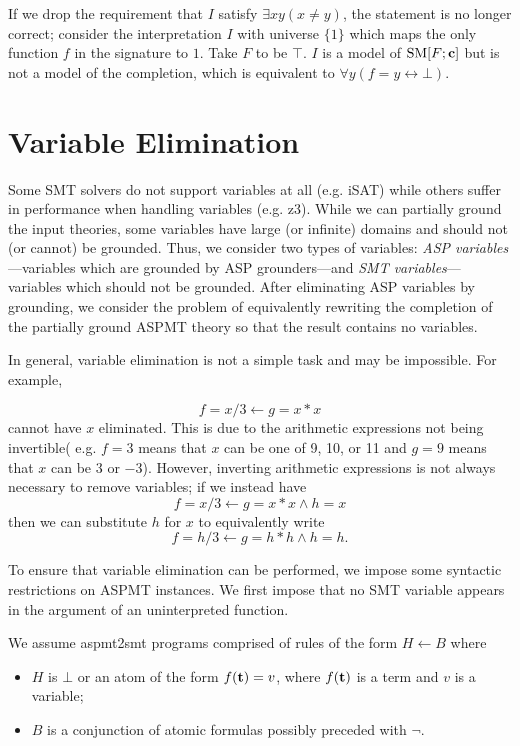 \documentclass[runningheads]{llncs}
\def\ar{\leftarrow}
\def\bi{\begin{itemize}}
\def\ei{\end{itemize}}
\def\ar{\leftarrow}
\def\sm{\hbox{\rm SM}}
\newcommand{\cblu}{\color{blue}}
\newcommand{\cbla}{\color{black}}
\begin{document}
\BOCC
\cblu
If we drop the requirement that $I$ satisfy $\exists xy(x \ne y)$, the statement is no longer correct; consider the interpretation $I$ with universe $\{1\}$ which maps the only function $f$ in the signature to $1$. Take $F$ to be $\top$. $I$ is a model of $\sm[F;{\bf c}]$ but is not a model of the completion, which is equivalent to $\forall y (f = y \leftrightarrow \bot)$.
\cbla
\EOCC

\section{Variable Elimination}\label{sec:variable}

Some SMT solvers do not support variables at all (e.g. iSAT) while
others suffer in performance when handling  variables (e.g. {\sc z3}). 
While we can partially ground the input theories, some variables have large
(or infinite) domains and should not (or cannot) be grounded. Thus, we
consider two types of variables: {\em ASP variables}---variables
which are grounded by ASP grounders---and {\em SMT variables}---variables
which should not be grounded. After eliminating ASP variables by
grounding, we consider the problem of equivalently rewriting the
completion of the partially ground ASPMT theory 
so that the result contains no variables. 

\BOCC
In general, variable elimination is
not a simple task and may be impossible. 
For example, 

$$f = x/3 \leftarrow g = x*x$$
cannot have $x$ eliminated. This is due to the arithmetic expressions
not being invertible( e.g. $f = 3$ means that $x$ can be one of 9, 10,
or 11 and $g = 9$ means that $x$ can be $3$ or $-3$). However,
inverting arithmetic expressions is not always necessary to remove
variables; if we instead have 
$$f = x/3 \leftarrow g = x*x \land h = x$$
then we can substitute $h$ for $x$ to equivalently write
$$f = h/3 \leftarrow g = h*h \land h = h.$$
\EOCC


To ensure that variable elimination can be performed, we impose some
syntactic restrictions on ASPMT instances. We first impose that no 
SMT variable appears in the argument of an uninterpreted function.

We assume {\sc aspmt2smt} programs comprised of rules of the form 
$H \ar B$ where 
\bi
\item  $H$ is $\bot$ or an atom of the form $f({\bf t})=v$, where
  $f({\bf t})$ is a term and $v$ is a variable;
\item  $B$ is a conjunction of atomic formulas possibly preceded with
  $\neg$.
\ei
\end{document}
